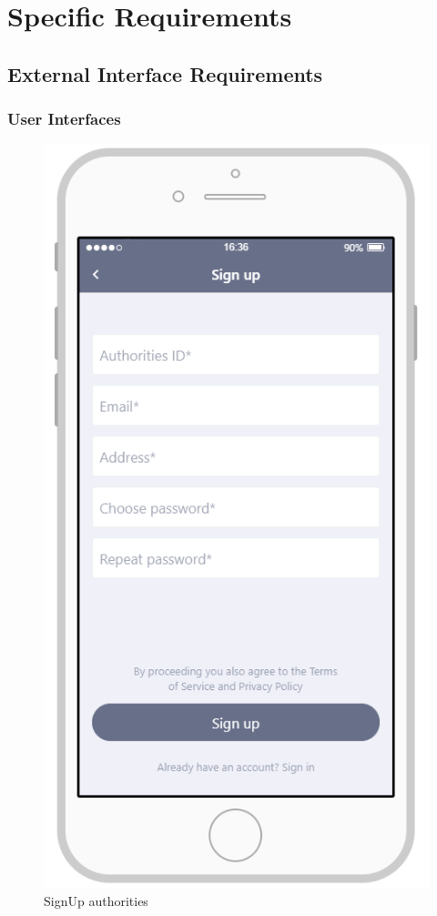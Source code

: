 \documentclass{article}
\begin{document}
\section{Specific Requirements}
\subsection{External Interface Requirements}
\subsubsection{User Interfaces}
\begin{figure}[H]
    \centering
    \includegraphics[scale=0.7]{Images/SignUpAuthoritiesApp}
    \caption{SignUp authorities}
\end{figure}
\end{document}
